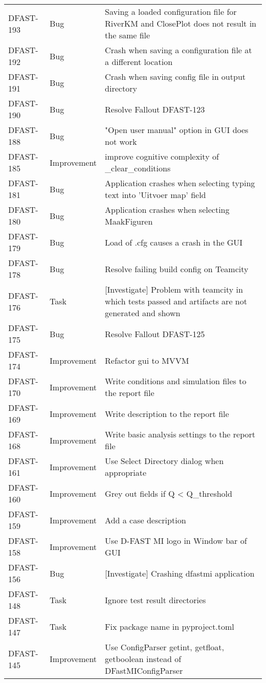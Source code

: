 \documentclass[git]{deltares_manual}
\begin{document}
\begin{longtable}{l|l|p{8cm}}
DFAST-193 & Bug & Saving a loaded configuration file for RiverKM and ClosePlot does not result in the same file \\
DFAST-192 & Bug & Crash when saving a configuration file at a different location \\
DFAST-191 & Bug & Crash when saving config file in output directory \\
DFAST-190 & Bug & Resolve Fallout DFAST-123 \\
DFAST-188 & Bug & "Open user manual" option in GUI does not work \\
DFAST-185 & Improvement & improve cognitive complexity of \_clear\_conditions \\
DFAST-181 & Bug & Application crashes when selecting typing text into 'Uitvoer map' field \\
DFAST-180 & Bug & Application crashes when selecting MaakFiguren \\
DFAST-179 & Bug & Load of .cfg causes a crash in the GUI \\
DFAST-178 & Bug & Resolve failing build config on Teamcity \\
DFAST-176 & Task & [Investigate] Problem with teamcity in which tests passed and artifacts are not generated and shown \\
DFAST-175 & Bug & Resolve Fallout DFAST-125  \\
DFAST-174 & Improvement & Refactor gui to MVVM \\
DFAST-170 & Improvement & Write conditions and simulation files to the report file \\
DFAST-169 & Improvement & Write description to the report file \\
DFAST-168 & Improvement & Write basic analysis settings to the report file \\
DFAST-161 & Improvement & Use Select Directory dialog when appropriate \\
DFAST-160 & Improvement & Grey out fields if Q < Q\_threshold \\
DFAST-159 & Improvement & Add a case description \\
DFAST-158 & Improvement & Use D-FAST MI logo in Window bar of GUI \\
DFAST-156 & Bug & [Investigate] Crashing dfastmi application \\
DFAST-148 & Task & Ignore test result directories \\
DFAST-147 & Task & Fix package name in pyproject.toml \\
DFAST-145 & Improvement & Use ConfigParser getint, getfloat, getboolean instead of DFastMIConfigParser \\

\end{longtable}
\end{document}
